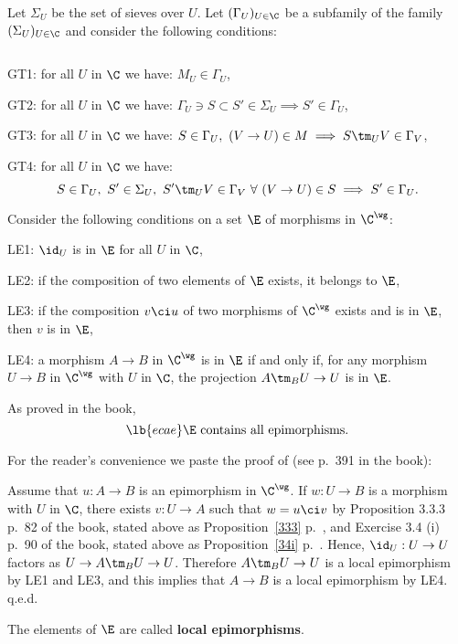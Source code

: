 \documentclass[12pt]{article}
\theoremstyle{remark}
\theoremstyle{definition}
\begin{document}
Let $\Sigma_U$ be the set of sieves over $U$. Let $(\Gamma_U)_{U\in\C}$ be a subfamily of the family $(\Sigma_U)_{U\in\C}$ and consider the following conditions:

\begin{cond}
$\ $

\nn GT1: for all $U$ in $\C$ we have: $M_U\in\Gamma_U$,

\nn GT2: for all $U$ in $\C$ we have: $\Gamma_U\ni S\subset S'\in\Sigma_U\implies S'\in\Gamma_U$,

\nn GT3: for all $U$ in $\C$ we have: $S\in\Gamma_U,\ (V\to U)\in M\implies S\tm_UV\in\Gamma_V$,

\nn GT4: for all $U$ in $\C$ we have: 
$$
S\in\Gamma_U,\ S'\in\Sigma_U,\ S'\tm_UV\in\Gamma_V\ \forall\ (V\to U)\in S\implies S'\in\Gamma_U.
$$
\end{cond}

Consider the following conditions on a set $\E$ of morphisms in $\C^\wg$:

\nn LE1: $\id_U$ is in $\E$ for all $U$ in $\C$,

\nn LE2: if the composition of two elements of $\E$ exists, it belongs to $\E$,

\nn LE3: if the composition $v\ci u$ of two morphisms of $\C^\wg$ exists and is in $\E$, then $v$ is in $\E$,

\nn LE4: a morphism $A\to B$ in $\C^\wg$ is in $\E$ if and only if, for any morphism $U\to B$ in $\C^\wg$ with $U$ in $\C$, the projection $A\tm_BU\to U$ is in $\E$.

As proved in the book, 
\begin{equation}\lb{ecae}
\E\text{ contains all epimorphisms.}
\end{equation}

For the reader's convenience we paste the proof of  (see p.~391 in the book):

Assume that $u:A\to B$ is an epimorphism in $\C^\wg$. If $w:U\to B$ is a morphism with $U$ in $\C$, there exists $v:U\to A$ such that $w=u\ci v$ by Proposition 3.3.3 p.~82 of the book, stated above as Proposition~\ref{333} p.~, and Exercise 3.4 (i) p.~90 of the book, stated above as Proposition~\ref{34i} p.~. Hence, $\id_U:U\to U$ factors as $U\to A\tm_BU\to U$. Therefore $A\tm_BU\to U$ is a local epimorphism by LE1 and LE3, and this implies that $A\to B$ is a local epimorphism by LE4. q.e.d.

The elements of $\E$ are called \textbf{local epimorphisms}.
\end{document}

